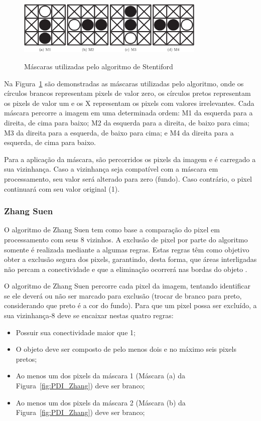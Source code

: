 \documentclass[12pt,oneside,a4paper,english,french,spanish,brazil,]{abntex2}
\begin{document}
\begin{figure}[ht]
\centering
\caption{Máscaras utilizadas pelo algoritmo de Stentiford}
\includegraphics[width=0.8\textwidth]{imagens/PDI_Stentiford_1.PNG}
\label{fig:PDI_Stentiford_1}
\end{figure}

Na Figura~\ref{fig:PDI_Stentiford_1} são demonstradas as máscaras utilizadas pelo algoritmo, onde os círculos brancos representam pixels de valor zero, os círculos pretos representam os pixels de valor um e os X representam os pixels com valores irrelevantes. Cada máscara percorre a imagem em uma determinada ordem: M1 da esquerda para a direita, de cima para baixo; M2 da esquerda para a direita, de baixo para cima; M3 da direita para a esquerda, de baixo para cima; e M4 da direita para a esquerda, de cima para baixo.

Para a aplicação da máscara, são percorridos os pixels da imagem e é carregado a sua vizinhança. Caso a vizinhança seja compatível com a máscara em processamento, seu valor será alterado para zero (fundo). Caso contrário, o pixel continuará com seu valor original (1).

\subsubsection{Zhang Suen}

O algoritmo de Zhang Suen \cite{zhang:1984} tem como base a comparação do pixel em processamento com seus 8 vizinhos. A exclusão de pixel por parte do algoritmo somente é realizada mediante a algumas regras. Estas regras têm como objetivo obter a exclusão segura dos pixels, garantindo, desta forma, que áreas interligadas não percam a conectividade e que a eliminação ocorrerá nas bordas do objeto \cite{guilherme:2007}.

O algoritmo de Zhang Suen percorre cada pixel da imagem, tentando identificar se ele deverá ou não ser marcado para exclusão (trocar de branco para preto, considerando que preto é a cor do fundo). Para que um pixel possa ser excluído, a sua vizinhança-8 deve se encaixar nestas quatro regras:
\begin{itemize}
\item Possuir sua conectividade maior que 1;
\item O objeto deve ser composto de pelo menos dois e no máximo seis pixels pretos;
\item Ao menos um dos pixels da máscara 1 (Máscara (a) da Figura~\ref{fig:PDI_Zhang}) deve ser branco;
\item Ao menos um dos pixels da máscara 2 (Máscara (b) da Figura~\ref{fig:PDI_Zhang}) deve ser branco;
\end{itemize}
\end{document}
